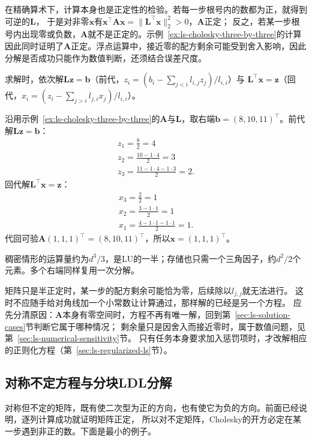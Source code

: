 在精确算术下，计算本身也是正定性的检验。若每一步根号内的数都为正，就得到可逆的$\bm L$，
于是对非零$\bm x$有$\bm x^\top\bm A\bm x=\lVert\bm L^\top\bm x\rVert_2^2>0$，$\bm A$正定；
反之，若某一步根号内出现零或负数，$\bm A$就不是正定的。示例~\ref{ex:ls-cholesky-three-by-three}的计算因此同时证明了$\bm A$正定。浮点运算中，接近零的配方剩余可能受到舍入影响，因此分解是否成功只能作为数值判断，还须结合误差尺度。

求解时，依次解$\bm L\bm z=\bm b$（前代，$z_i=(b_i-\sum_{j<i}l_{i,j}z_j)/l_{i,i}$）与
$\bm L^\top\bm x=\bm z$（回代，$x_i=(z_i-\sum_{j>i}l_{j,i}x_j)/l_{i,i}$）。

\begin{example}[用Cholesky因子求解]
\label{ex:ls-cholesky-solve}
沿用示例~\ref{ex:ls-cholesky-three-by-three}的$\bm A$与$\bm L$，取右端$\bm b=(8,10,11)^\top$。前代解$\bm L\bm z=\bm b$：
\[
 \begin{gathered}
z_1=\frac82=4\\
z_2=\frac{10-1\cdot4}{2}=3\\
z_3=\frac{11-1\cdot4-1\cdot3}{2}=2.
 \end{gathered}
\]
回代解$\bm L^\top\bm x=\bm z$：
\[
 \begin{gathered}
x_3=\frac22=1\\
x_2=\frac{3-1\cdot1}{2}=1\\
x_1=\frac{4-1\cdot1-1\cdot1}{2}=1.
 \end{gathered}
\]
代回可验$\bm A(1,1,1)^\top=(8,10,11)^\top$，所以$\bm x=(1,1,1)^\top$。
\end{example}

稠密情形的运算量约为$d^3/3$，是LU的一半；存储也只需一个三角因子，约$d^2/2$个元素。多个右端同样复用一次分解。

矩阵只是半正定时，某一步的配方剩余可能恰为零，后续除以$l_{j,j}$就无法进行。
这时不应随手给对角线加一个小常数让计算通过，那样解的已经是另一个方程。
应先分清原因：$\bm A$本身有零空间时，方程不再有唯一解，回到第~\ref{sec:ls-solution-cases}节判断它属于哪种情况；
剩余量只是因舍入而接近零时，属于数值问题，见第~\ref{sec:ls-numerical-sensitivity}节。
只有任务本身要求加入惩罚项时，才改解相应的正则化方程（第~\ref{sec:ls-regularized-ls}节）。

\subsection{对称不定方程与分块LDL分解}
\label{sec:ls-ldlt}

对称但不定的矩阵，既有使二次型为正的方向，也有使它为负的方向。前面已经说明，逐列计算成功就证明矩阵正定，
所以对不定矩阵，Cholesky的开方必定在某一步遇到非正的数。下面是最小的例子。

